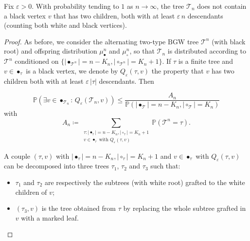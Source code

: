 \documentclass[10pt]{amsart}
\theoremstyle{definition}\newtheorem{defi}[theo]{Definition}\newtheorem{rema}[theo]{Remark}\newtheorem{exam}[theo]{Example}\newtheorem{exem}[theo]{Example}\newtheorem{nota}[theo]{Notation}
\providecommand{\abs}[1]{\lvert#1\rvert}
\def\eps{\varepsilon}
\def\mubn{\mu_{\bullet}^{n}}
\def\mucn{\mu_{\circ}^{n}}
\newcommand\BGW{\textrm{BGW}}
\def\Ts{\mathscr{T}}
\renewcommand{\epsilon}{\varepsilon}
\renewcommand\Pr[1]{\mathbb{P}\left(#1\right)}
\begin{document}
\begin{lemma}\label{lem:two}
Fix $\epsilon>0$. With probability tending to $1$ as $n \rightarrow \infty$, the tree $\Ts_{n}$ does not contain a black
  vertex $v$ that has two children, both with at least $\eps \, n$ descendants (counting both white and black vertices).  \label{lem:PasDeuxGrandsSousArbres}
\end{lemma}
\begin{proof}
As before, we consider the alternating two-type $\BGW$ tree $\Ts^{n}$ (with black root) and offspring distribution
  $\mubn$ and $\mucn$, so that $\Ts_{n}$ is distributed according to $\Ts^{n}$ conditioned on
  \hbox{$\{ \abs{\bullet_{\Ts^{n}}}=n-K_n, \abs{\circ_{\Ts^{n}}} =K_n+1\}$}.
  If $\tau$ is a finite tree and $v \in \bullet_{\tau}$ is a black vertex, we denote by
  $Q_\eps(\tau,v)$ the property that $v$ has two children both with at least $\eps \, |\tau|$ descendants. Then

  \[    \Pr{\exists v \in \bullet_{\Ts_{n}}: \, Q_\eps(\Ts_{n},v)} \le \frac{A_{n}}{\Pr{\abs{\bullet_{\Ts}}=n-K_n, \abs{\circ_{\Ts}} =K_n}}\]
  with \[A_{n} \coloneqq \sum_{\substack{\tau: \abs{\bullet_{\tau}}=n-K_n, \abs{\circ_{\tau}} =K_n+1  \\v \in \bullet_{\tau} \textrm{ with } Q_\eps(\tau,v)}} \Pr{\Ts^{n}=\tau}.\]

  A couple $(\tau,v)$ with $\abs{\bullet_{\tau}}=n-K_n, \abs{\circ_{\tau}} =K_n+1$ and $v \in \bullet_{\tau} $ with $Q_\eps(\tau,v)$
 can be decomposed into three trees $\tau_{1}$, $\tau_{2}$ and $\tau_{3}$ such that:
  \begin{itemize}
    \item $\tau_{1}$ and $\tau_{2}$ are respectively the subtrees (with white root) grafted to the white children of $v$;
    \item $(\tau_{3},v)$ is the tree
      obtained from $\tau$ by replacing the whole subtree grafted in $v$ with a marked leaf.
  \end{itemize}


\end{proof}
\end{document}
